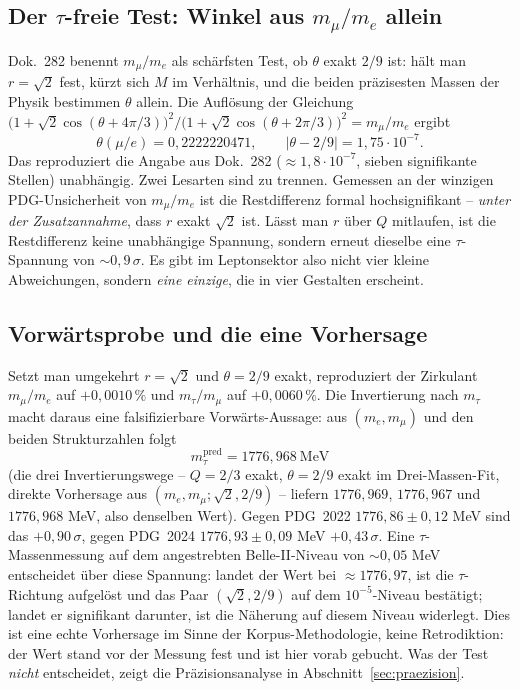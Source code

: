 \subsection{Der $\tau$-freie Test: Winkel aus $m_\mu/m_e$ allein}
Dok.~282 benennt $m_\mu/m_e$ als schärfsten Test, ob $\theta$ exakt $2/9$
ist: hält man $r=\sqrt2$ fest, kürzt sich $M$ im Verhältnis, und die beiden
präzisesten Massen der Physik bestimmen $\theta$ allein. Die Auflösung der
Gleichung
$\bigl(1+\sqrt2\cos(\theta+4\pi/3)\bigr)^2/\bigl(1+\sqrt2\cos(\theta+2\pi/3)\bigr)^2
= m_\mu/m_e$ ergibt
\begin{equation}
  \theta(\mu/e) = 0{,}2222220471,\qquad |\theta-2/9| = 1{,}75\cdot10^{-7}.
\end{equation}
Das reproduziert die Angabe aus Dok.~282 ($\approx1{,}8\cdot10^{-7}$, sieben
signifikante Stellen) unabhängig. Zwei Lesarten sind zu trennen. Gemessen an
der winzigen PDG-Unsicherheit von $m_\mu/m_e$ ist die Restdifferenz formal
hochsignifikant -- \emph{unter der Zusatzannahme}, dass $r$ exakt $\sqrt2$
ist. Lässt man $r$ über $Q$ mitlaufen, ist die Restdifferenz keine
unabhängige Spannung, sondern erneut dieselbe eine $\tau$-Spannung von
$\sim0{,}9\,\sigma$. Es gibt im Leptonsektor also nicht vier kleine
Abweichungen, sondern \emph{eine einzige}, die in vier Gestalten erscheint.

\subsection{Vorwärtsprobe und die eine Vorhersage}
Setzt man umgekehrt $r=\sqrt2$ und $\theta=2/9$ exakt, reproduziert der
Zirkulant $m_\mu/m_e$ auf $+0{,}0010\,\%$ und $m_\tau/m_\mu$ auf
$+0{,}0060\,\%$. Die Invertierung nach $m_\tau$ macht daraus eine
falsifizierbare Vorwärts-Aussage: aus $(m_e, m_\mu)$ und den beiden
Strukturzahlen folgt
\begin{equation}
  m_\tau^{\text{pred}} = 1776{,}968\ \text{MeV}
\end{equation}
(die drei Invertierungswege -- $Q=2/3$ exakt, $\theta=2/9$ exakt im
Drei-Massen-Fit, direkte Vorhersage aus $(m_e,m_\mu;\sqrt2,2/9)$ -- liefern
$1776{,}969$, $1776{,}967$ und $1776{,}968$ MeV, also denselben Wert). Gegen
PDG~2022 $1776{,}86\pm0{,}12$ MeV sind das $+0{,}90\,\sigma$, gegen PDG~2024
$1776{,}93\pm0{,}09$ MeV $+0{,}43\,\sigma$. Eine
$\tau$-Massenmessung auf dem angestrebten Belle-II-Niveau von
$\sim0{,}05$ MeV entscheidet über diese Spannung: landet der Wert bei
$\approx1776{,}97$, ist die $\tau$-Richtung aufgelöst und das Paar
$(\sqrt2, 2/9)$ auf dem $10^{-5}$-Niveau bestätigt; landet er signifikant
darunter, ist die Näherung auf diesem Niveau widerlegt. Dies ist eine echte
Vorhersage im Sinne der Korpus-Methodologie, keine Retrodiktion: der Wert
stand vor der Messung fest und ist hier vorab gebucht. Was der Test
\emph{nicht} entscheidet, zeigt die Präzisionsanalyse in
Abschnitt~\ref{sec:praezision}.

